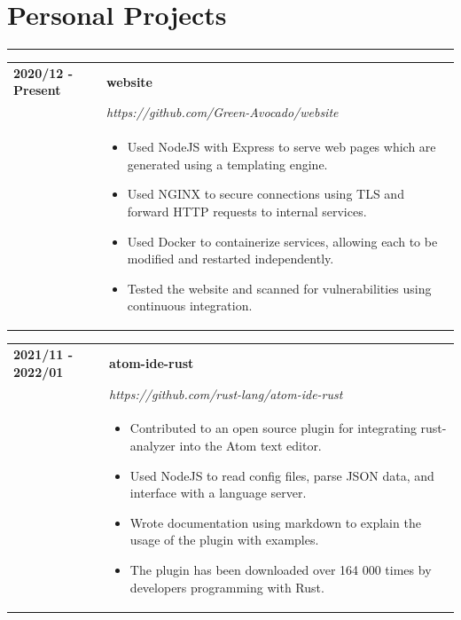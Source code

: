 \documentclass[letterpaper]{article}
\newcommand{\sect}[1]{\section*{#1}
                        {\color{cyan}
                        \rule{\textwidth}{1pt}
                        \vspace{-1ex}}}
\begin{document}
    \sect{Personal Projects}

        \begin{tabular}{p{} p{}}
            \textbf{2020/12 - Present} & \textbf{website} \\
            & \emph{https://github.com/Green-Avocado/website} \\
            & \begin{itemize}
                \item Used NodeJS with Express to serve web pages which are generated using a templating
                    engine.
                \item Used NGINX to secure connections using TLS and forward HTTP requests to internal
                    services.
                \item Used Docker to containerize services, allowing each to be modified and restarted
                    independently.
                \item Tested the website and scanned for vulnerabilities using continuous integration.
            \end{itemize}
        \end{tabular}

        \begin{tabular}{p{} p{}}
            \textbf{2021/11 - 2022/01} & \textbf{atom-ide-rust} \\
            & \emph{https://github.com/rust-lang/atom-ide-rust} \\
            & \begin{itemize}
                \item Contributed to an open source plugin for integrating rust-analyzer into the Atom
                    text editor.
                \item Used NodeJS to read config files, parse JSON data, and interface with a language
                    server.
                \item Wrote documentation using markdown to explain the usage of the plugin with examples.
                \item The plugin has been downloaded over 164 000 times by developers programming with
                    Rust.
            \end{itemize}
        \end{tabular}
\end{document}
